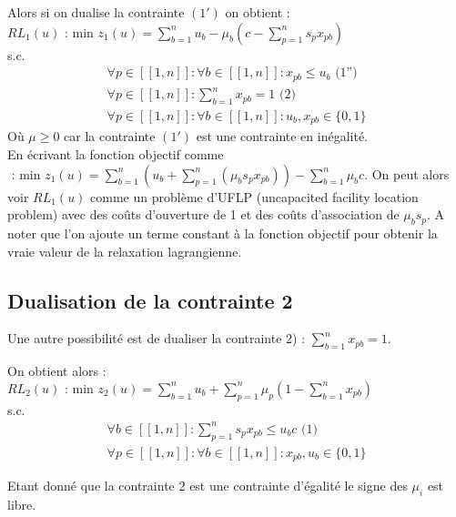 \documentclass{article}
\begin{document}
Alors si on dualise la contrainte $(1')$ on obtient :\\
$RL_1(u) \text{ : min } z_1(u) = \sum \limits_{b = 1}^{n} u_b - \mu_b (c - \sum \limits_{p = 1}^{n} s_p x_{pb} )$\\
s.c.
\begin{align*}
 \forall p \in [\![ 1 , n ]\!] : \forall b \in [\![ 1 , n ]\!] : x_{pb} \leqslant u_b \text{ (1'')}\\
 \forall p \in [\![ 1 , n ]\!] : \sum \limits_{b = 1}^{n} x_{pb} = 1 \text{ (2)}\\
 \forall p \in [\![ 1 , n ]\!] : \forall b \in [\![ 1 , n ]\!] : u_b , x_{pb} \in \{0,1\}
\end{align*}
Où $\mu \geqslant 0$ car la contrainte $(1')$ est une contrainte en inégalité.\\

En écrivant la fonction objectif comme  $\text{ : min } z_1(u) = \sum \limits_{b = 1}^{n}( u_b + \sum \limits_{p = 1}^n (\mu_b s_p x_{pb})) - \sum \limits_{b = 1}^{n} \mu_b c$. On peut alors voir $RL_1(u)$ comme un problème d'UFLP (uncapacited facility location problem) avec des coûts d'ouverture de 1 et des coûts d'association de $\mu_b s_p$. A noter que l'on ajoute un terme constant à la fonction objectif pour obtenir la vraie valeur de la relaxation lagrangienne.

\subsection{Dualisation de la contrainte 2}

Une autre possibilité est de dualiser la contrainte 2) : $\sum_{b=1}^n x_{pb} = 1$. \newline

On obtient alors :\\
$RL_2(u) \text{ : min } z_2(u) = \sum \limits_{b = 1}^{n} u_b + \sum \limits_{p = 1}^{n} \mu_p (1 - \sum \limits_{b = 1}^{n} x_{pb})$\\
s.c.
\begin{align*}
 \forall b \in [\![ 1 , n ]\!] : \sum \limits_{p = 1}^{n} s_p x_{pb} \leqslant u_b c \text{ (1)}\\
 \forall p \in [\![ 1 , n ]\!] : \forall b \in [\![ 1 , n ]\!] : x_{pb}, u_b \in \{0,1\}
\end{align*}

Etant donné que la contrainte 2 est une contrainte d'égalité le signe des $\mu_i$ est libre.\newline
\end{document}
